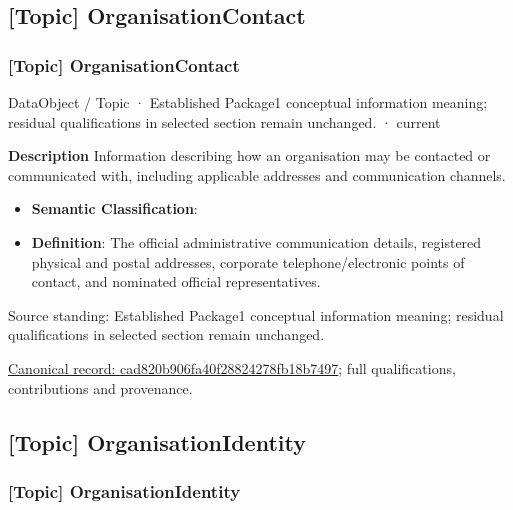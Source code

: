 \subsection{[Topic] OrganisationContact}

\subsubsection{[Topic] OrganisationContact}

\label{element:cad820b906fa40f28824278fb18b7497}
{\small DataObject / Topic · Established Package1 conceptual information meaning; residual qualifications in selected section remain unchanged. · current}\par

\textbf{Description}
Information describing how an organisation may be contacted or communicated with, including applicable addresses and communication channels.



\begin{itemize}


\item \textbf{Semantic Classification}: \texttt{}

\item \textbf{Definition}: The official administrative communication details, registered physical and postal addresses, corporate telephone/electronic points of contact, and nominated official representatives.

\end{itemize}


Source standing: Established Package1 conceptual information meaning; residual qualifications in selected section remain unchanged.


{\footnotesize \href{../../../../continuum/application/data-object/topic/cad820b906fa40f28824278fb18b7497.md}{Canonical record: cad820b906fa40f28824278fb18b7497}; full qualifications, contributions and provenance.}\par
\subsection{[Topic] OrganisationIdentity}

\subsubsection{[Topic] OrganisationIdentity}

